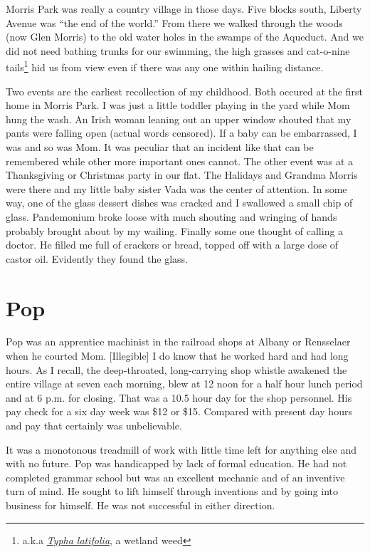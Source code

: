\documentclass[12pt]{book}              %
\begin{document}
Morris Park was really a country village in those days. Five blocks south, Liberty Avenue was ``the end of the world.'' From there we walked through the woods (now Glen Morris) to the old water holes in the swamps of the Aqueduct. And we did not need bathing trunks for our swimming, the high grasses and cat-o-nine tails\footnote{a.k.a \href{http://en.wikipedia.org/wiki/Typha_latifolia}{\it Typha latifolia}, a wetland weed} hid us from view even if there was any one within hailing distance. 

Two events are the earliest recollection of my childhood. Both occured at the first home in Morris Park. I was just a little toddler playing in the yard while Mom hung the wash. An Irish woman leaning out an upper window shouted that my pants were falling open (actual words censored). If a baby can be embarrassed, I was and so was Mom. It was peculiar that an incident like that can be remembered while other more important ones cannot. The other event was at a Thanksgiving or Christmas party in our flat. The Halidays and Grandma Morris were there and my little baby sister Vada was the center of attention. In some way, one of the glass dessert dishes was cracked and I swallowed a small chip of glass. Pandemonium broke loose with much shouting and wringing of hands probably brought about by my wailing. Finally some one thought of calling a doctor. He filled me full of crackers or bread, topped off with a large dose of castor oil. Evidently they found the glass. 

\section*{Pop}

Pop was an apprentice machinist in the railroad shops at Albany or Rensselaer when he courted Mom. [Illegible] I do know that he worked hard and had long hours. As I recall, the deep-throated, long-carrying shop whistle awakened the entire village at seven each morning, blew at 12 noon for a half hour lunch period and at 6 p.m. for closing. That was a 10.5 hour day for the shop personnel. His pay check for a six day week was \$12 or \$15. Compared with present day hours and pay that certainly was unbelievable. 

It was a monotonous treadmill of work with little time left for anything else and with no future. Pop was handicapped by lack of formal education. He had not completed grammar school but was an excellent mechanic and of an inventive turn of mind. He sought to lift himself through inventions and by going into business for himself. He was not successful in either direction. 
\end{document}
